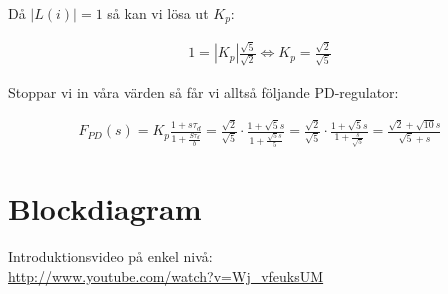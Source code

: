 \documentclass[a4paper]{article}
\begin{document}
Då $|L(i)| = 1$ så kan vi lösa ut $K_p$:

\begin{align*}
  1 = |K_p| \frac{\sqrt{5}}{\sqrt{2}} \Longleftrightarrow K_p = \frac{\sqrt{2}}{\sqrt{5}}
\end{align*}

Stoppar vi in våra värden så får vi alltså följande PD-regulator:

\begin{align*}
  F_{PD}(s) = K_p \frac{1+s\tau_d}{1+\frac{S\tau_d}{b}} = \frac{\sqrt{2}}{\sqrt{5}} \cdot \frac{1+\sqrt{5}s}{1+\frac{\sqrt{5}s}{5}} =
  \frac{\sqrt{2}}{\sqrt{5}} \cdot \frac{1+\sqrt{5}s}{1+\frac{s}{\sqrt{5}}} = \frac{\sqrt{2}+\sqrt{10}s}{\sqrt{5} + s}
\end{align*}






\section{Blockdiagram}
Introduktionsvideo på enkel nivå:\\
\href{http://www.youtube.com/watch?v=Wj_vfeuksUM}{http://www.youtube.com/watch?v=Wj\_vfeuksUM}
\end{document}
